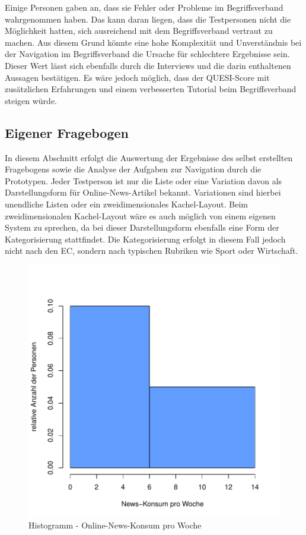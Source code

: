 Einige Personen gaben an, dass sie Fehler oder Probleme im Begriffsverband wahrgenommen haben.
Das kann daran liegen, dass die Testpersonen nicht die Möglichkeit hatten, sich ausreichend mit dem Begriffsverband vertraut zu machen.
Aus diesem Grund könnte eine hohe Komplexität und Unverständnis bei der Navigation im Begriffsverband die Ursache für schlechtere Ergebnisse sein.
Dieser Wert lässt sich ebenfalls durch die Interviews und die darin enthaltenen Aussagen bestätigen.
Es wäre jedoch möglich, dass der \ac{QUESI}-Score mit zusätzlichen Erfahrungen und einem verbesserten Tutorial beim Begriffsverband steigen würde.

\subsection{Eigener Fragebogen}
In diesem Abschnitt erfolgt die Auswertung der Ergebnisse des selbst erstellten Fragebogens sowie die Analyse der Aufgaben zur Navigation durch die Prototypen.
Jeder Testperson ist nur die Liste oder eine Variation davon als Darstellungsform für Online-News-Artikel bekannt.
Variationen sind hierbei unendliche Listen oder ein zweidimensionales Kachel-Layout.
Beim zweidimensionalen Kachel-Layout wäre es auch möglich von einem eigenen System zu sprechen, da bei dieser Darstellungsform ebenfalls eine Form der Kategorisierung stattfindet.
Die Kategorisierung erfolgt in diesem Fall jedoch nicht nach den \ac{EC}, sondern nach typischen Rubriken wie Sport oder Wirtschaft.\\

\begin{figure}[!ht]
    \centering
    \includegraphics[width=0.6\columnwidth]{figures/news-frequency.pdf}
    \caption{\label{fig:news-consumption}Histogramm - Online-News-Konsum pro Woche}
\end{figure}

